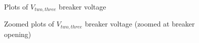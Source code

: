 \documentclass[10pt, oneside, letterpaper]{article}
\begin{document}
\begin{figure}[H]
    \begin{center}
        
    \end{center}
    \caption{Plots of $V_{two, three}$ breaker voltage}
    \label{pscad_breaker_v_plots}
\end{figure}

\begin{figure}[H]
    \begin{center}
        
    \end{center}
    \caption{Zoomed plots of $V_{two, three}$ breaker voltage (zoomed at breaker opening)}
    \label{pscad_breaker_v_plots_zoom}
\end{figure}

\newpage
\end{document}
